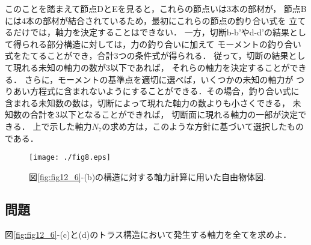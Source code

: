 \documentclass[10pt,a4j]{jarticle}
\begin{document}
このことを踏まえて節点DとEを見ると，これらの節点いは3本の部材が，
節点Bには4本の部材が結合されているため，最初にこれらの節点の釣り合い式を
立てるだけでは，軸力を決定することはできない．
一方，切断b-b'やd-d'の結果として得られる部分構造に対しては，力の釣り合いに加えて
モーメントの釣り合い式をたてることができ，合計3つの条件式が得られる．
従って，切断の結果として現れる未知の軸力の数が3以下であれば，
それらの軸力を決定することができる．
さらに，モーメントの基準点を適切に選べば，いくつかの未知の軸力が
つりあい方程式に含まれないようにすることができる．その場合，釣り合い式に
含まれる未知数の数は，切断によって現れた軸力の数よりも小さくできる，
未知数の合計を3以下となることができれば，
切断面に現れる軸力の一部が決定できる．
上で示した軸力$N_7$の求め方は，このような方針に基づいて選択したものである．
\begin{figure}[h]
	\begin{center}
	\texttt{[image: ./fig8.eps]} 
	\end{center}
	\caption{
	図\ref{fig:fig12_6}-(b)の構造に対する軸力計算に用いた自由物体図.
	} 
	\label{fig:fig12_8}
\end{figure}
\subsection{問題}
図\ref{fig:fig12_6}-(c)と(d)のトラス構造において発生する軸力を全てを求めよ．
\end{document}

